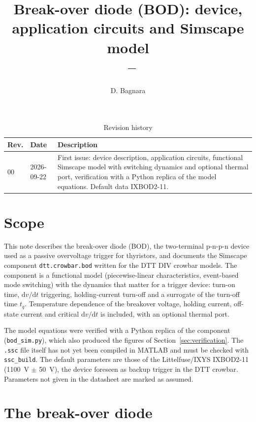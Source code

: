 \documentclass[11pt,a4paper]{article}
\title{Break-over diode (BOD): device, application circuits and Simscape model \ssc{dtt.crowbar.bod}\\[4pt]
{\large \docrev\ -- \docdate}}
\author{D. Bagnara}
\date{\docdate}
\newcommand{\docdate}{2026-09-22}
\newcommand{\dvdt}{\mathrm{d}v/\mathrm{d}t}
\newcommand{\ssc}[1]{\texttt{#1}}
\begin{document}
\maketitle

\begin{table}[h]
\centering
\caption{Revision history}
\begin{tabular}{@{}llp{9cm}@{}}
\toprule
Rev. & Date & Description \\
\midrule
00 & \docdate & First issue: device description, application circuits, functional Simscape model with switching dynamics and optional thermal port, verification with a Python replica of the model equations. Default data IXBOD2-11. \\
\bottomrule
\end{tabular}
\end{table}

\tableofcontents

\section{Scope}
This note describes the break-over diode (BOD), the two-terminal p-n-p-n device used as a passive overvoltage trigger for thyristors, and documents the Simscape component \ssc{dtt.crowbar.bod} written for the DTT DIV crowbar models. The component is a functional model (piecewise-linear characteristics, event-based mode switching) with the dynamics that matter for a trigger device: turn-on time, $\dvdt$ triggering, holding-current turn-off and a surrogate of the turn-off time $t_q$. Temperature dependence of the breakover voltage, holding current, off-state current and critical $\dvdt$ is included, with an optional thermal port.

The model equations were verified with a Python replica of the component (\ssc{bod\_sim.py}), which also produced the figures of Section~\ref{sec:verification}. The \ssc{.ssc} file itself has not yet been compiled in MATLAB and must be checked with \ssc{ssc\_build}. The default parameters are those of the Littelfuse/IXYS IXBOD2-11 (\SI{1100}{V} $\pm$ \SI{50}{V}), the device foreseen as backup trigger in the DTT crowbar. Parameters not given in the datasheet are marked as assumed.

\section{The break-over diode}
\end{document}
